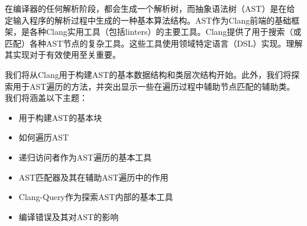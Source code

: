 在编译器的任何解析阶段，都会生成一个解析树，而抽象语法树（AST）是在给定输入程序的解析过程中生成的一种基本算法结构。AST作为Clang前端的基础框架，是各种Clang实用工具（包括linters）的主要工具。Clang提供了用于搜索（或匹配）各种AST节点的复杂工具。这些工具使用领域特定语言（DSL）实现。理解其实现对于有效使用至关重要。

我们将从Clang用于构建AST的基本数据结构和类层次结构开始。此外，我们将探索用于AST遍历的方法，并突出显示一些在遍历过程中辅助节点匹配的辅助类。我们将涵盖以下主题：

\begin{itemize}
\item
用于构建AST的基本块

\item
如何遍历AST

\item
递归访问者作为AST遍历的基本工具

\item
AST匹配器及其在辅助AST遍历中的作用

\item
Clang-Query作为探索AST内部的基本工具

\item
编译错误及其对AST的影响
\end{itemize}